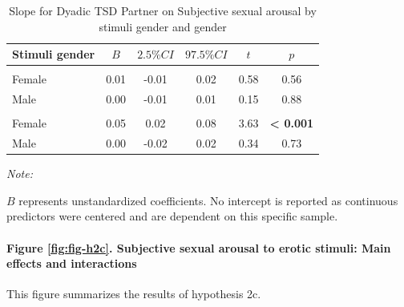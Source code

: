 \documentclass[
  bookmarksnumbered]{article}
\begin{document}
\begin{table}[H]
\centering
\caption{\label{tab:unnamed-chunk-25}Slope for Dyadic TSD Partner on Subjective sexual arousal by
    stimuli gender and gender}
\centering
\begin{threeparttable}
\begin{tabular}[t]{lccccc}
\toprule
Stimuli gender & $B$ & $2.5\% CI$ & $97.5\% CI$ & $t$ & $p$\\
\midrule
\addlinespace[0.3em]
\multicolumn{6}{l}{\cellcolor{lightgray}{Gender: Women}}\\
\hspace{1em}Female & 0.01 & -0.01 & 0.02 & 0.58 & 0.56\\
\hspace{1em}Male & 0.00 & -0.01 & 0.01 & 0.15 & 0.88\\
\addlinespace[0.3em]
\multicolumn{6}{l}{\cellcolor{lightgray}{Gender: Men}}\\
\hspace{1em}Female & 0.05 & 0.02 & 0.08 & 3.63 & \textbf{< 0.001}\\
\hspace{1em}Male & 0.00 & -0.02 & 0.02 & 0.34 & 0.73\\
\bottomrule
\end{tabular}
\begin{tablenotes}[para]
\item \textit{Note: } 
\item $B$ represents unstandardized coefficients. No intercept is reported as
    continuous predictors were centered and are dependent on this specific sample.
\end{tablenotes}
\end{threeparttable}
\end{table}

\paragraph{Figure \ref{fig:fig-h2c}. Subjective sexual arousal to erotic stimuli: Main effects and interactions}\label{figure-reffigfig-h2c.-subjective-sexual-arousal-to-erotic-stimuli-main-effects-and-interactions}

This figure summarizes the results of hypothesis 2c.
\end{document}
